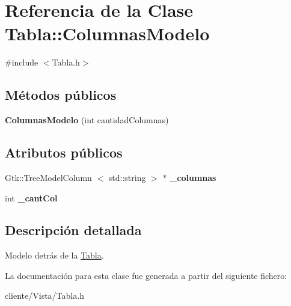 \hypertarget{classTabla_1_1ColumnasModelo}{\section{\-Referencia de la \-Clase \-Tabla\-:\-:\-Columnas\-Modelo}
\label{classTabla_1_1ColumnasModelo}
}


{\ttfamily \#include $<$\-Tabla.\-h$>$}

\subsection*{\-Métodos públicos}
\begin{DoxyCompactItemize}
\item 
\hypertarget{classTabla_1_1ColumnasModelo_aa13f101bfa970bbc0d5e18d3cc01e4b1}{{\bfseries \-Columnas\-Modelo} (int cantidad\-Columnas)}\label{classTabla_1_1ColumnasModelo_aa13f101bfa970bbc0d5e18d3cc01e4b1}

\end{DoxyCompactItemize}
\subsection*{\-Atributos públicos}
\begin{DoxyCompactItemize}
\item 
\hypertarget{classTabla_1_1ColumnasModelo_a10ec0eb254ecb02598b01625cca9452e}{\-Gtk\-::\-Tree\-Model\-Column\*
$<$ std\-::string $>$ $\ast$ {\bfseries \-\_\-columnas}}\label{classTabla_1_1ColumnasModelo_a10ec0eb254ecb02598b01625cca9452e}

\item 
\hypertarget{classTabla_1_1ColumnasModelo_aec1dd0a62a676ccd175e529287c65296}{int {\bfseries \-\_\-cant\-Col}}\label{classTabla_1_1ColumnasModelo_aec1dd0a62a676ccd175e529287c65296}

\end{DoxyCompactItemize}


\subsection{\-Descripción detallada}
\-Modelo detrás de la \hyperlink{classTabla}{\-Tabla}. 

\-La documentación para esta clase fue generada a partir del siguiente fichero\-:\begin{DoxyCompactItemize}
\item 
cliente/\-Vista/\-Tabla.\-h\end{DoxyCompactItemize}
